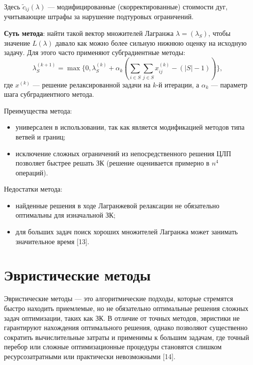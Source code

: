 Здесь $\tilde{c}_{ij}(\lambda)$ — модифицированные (скорректированные) стоимости дуг, 
учитывающие штрафы за нарушение подтуровых ограничений.

\textbf{Суть метода}: найти такой вектор множителей Лагранжа $\lambda = (\lambda_S)$, 
чтобы значение $L(\lambda)$ давало как можно более сильную нижнюю оценку на исходную задачу. 
Для этого часто применяют субградиентные методы:
\begin{equation}
\lambda_S^{(k+1)} = \max\{0, \lambda_S^{(k)} + \alpha_k(\sum_{i \in S}\sum_{j \in S} x_{ij}^{(k)} - (|S|-1)) \},
\end{equation}
где $x^{(k)}$ — решение релаксированной задачи на $k$-й итерации, 
а $\alpha_k$ — параметр шага субградиентного метода.

Преимущества метода:
\begin{itemize}[label=---]
    \item универсален в использовании, так как является модификацией методов типа ветвей и границ;
    \item исключение сложных ограничений из непосредственного решения ЦЛП позволяет быстрее решать ЗК (решение оценивается примерно в $n^4$ операций).
\end{itemize}

Недостатки метода:
\begin{itemize}[label=---]
    \item найденные решения в ходе Лагранжевой релаксации не обязательно оптимальны для изначальной ЗК;
    \item для больших задач поиск хороших множителей Лагранжа может занимать значительное время [13].
\end{itemize}
%
%
%
\section{Эвристические методы}
Эвристические методы --- это алгоритмические подходы, которые стремятся быстро находить приемлемые, но не обязательно оптимальные решения сложных задач оптимизации, таких как ЗК. В отличие от точных методов, эвристики не гарантируют нахождения оптимального решения, однако позволяют существенно сократить вычислительные затраты и применимы к большим задачам, где точный перебор или сложные оптимизационные процедуры становятся слишком ресурсозатратными или практически невозможными [14].

